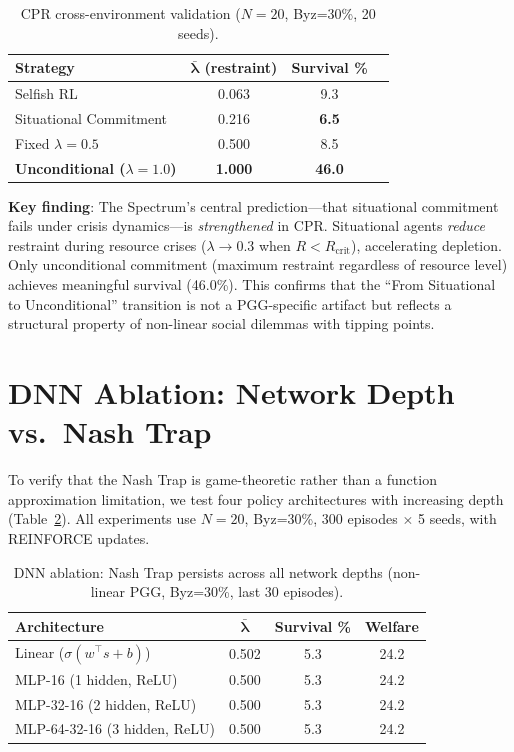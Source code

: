\documentclass{article}
\begin{document}
\begin{table}[h]
\centering
\caption{CPR cross-environment validation ($N{=}20$, Byz=30\%, 20 seeds).}
\label{tab:cpr}
\begin{tabular}{lccc}
\toprule
\textbf{Strategy} & $\boldsymbol{\bar{\lambda}}$ (restraint) & \textbf{Survival \%} \\
\midrule
Selfish RL & 0.063 & 9.3 \\
Situational Commitment & 0.216 & \textbf{6.5} \\
Fixed $\lambda=0.5$ & 0.500 & 8.5 \\
\textbf{Unconditional ($\lambda=1.0$)} & \textbf{1.000} & \textbf{46.0} \\
\bottomrule
\end{tabular}
\end{table}

\noindent \textbf{Key finding}: The Spectrum's central prediction---that situational commitment fails under crisis dynamics---is \emph{strengthened} in CPR. Situational agents \emph{reduce} restraint during resource crises ($\lambda \to 0.3$ when $R < R_{\text{crit}}$), accelerating depletion. Only unconditional commitment (maximum restraint regardless of resource level) achieves meaningful survival (46.0\%). This confirms that the ``From Situational to Unconditional'' transition is not a PGG-specific artifact but reflects a structural property of non-linear social dilemmas with tipping points.

\section{DNN Ablation: Network Depth vs.\ Nash Trap}
\label{app:dnn_ablation}

To verify that the Nash Trap is game-theoretic rather than a function approximation limitation, we test four policy architectures with increasing depth (Table~\ref{tab:dnn_ablation}).
All experiments use $N{=}20$, Byz=30\%, 300 episodes $\times$ 5 seeds, with REINFORCE updates.

\begin{table}[h]
\centering
\caption{DNN ablation: Nash Trap persists across all network depths (non-linear PGG, Byz=30\%, last 30 episodes).}
\label{tab:dnn_ablation}
\begin{tabular}{lccc}
\toprule
\textbf{Architecture} & $\boldsymbol{\bar{\lambda}}$ & \textbf{Survival \%} & \textbf{Welfare} \\
\midrule
Linear ($\sigma(w^\top s + b)$) & 0.502 & 5.3 & 24.2 \\
MLP-16 (1 hidden, ReLU) & 0.500 & 5.3 & 24.2 \\
MLP-32-16 (2 hidden, ReLU) & 0.500 & 5.3 & 24.2 \\
MLP-64-32-16 (3 hidden, ReLU) & 0.500 & 5.3 & 24.2 \\
\bottomrule
\end{tabular}
\end{table}
\end{document}
